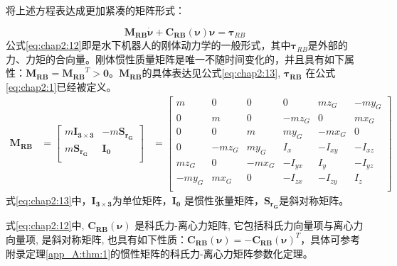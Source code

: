 将上述方程表达成更加紧凑的矩阵形式：

\begin{equation}
\label{eq:chap2:12}
\bm{M_{RB}} {\dot{\bm{\nu}}} + \bm{C_{RB}}(\bm{\nu}){\bm{\nu}} =  {\bm{\tau}_{RB}}
\end{equation}
公式\ref{eq:chap2:12}即是水下机器人的刚体动力学的一般形式，其中${\bm{\tau}_{RB}}$是外部的力、力矩的合向量。刚体惯性质量矩阵是唯一不随时间变化的，并且具有如下属性：$\bm{M_{RB}} = \bm{M_{RB}}^T > \bm{0}$。$\bm{M_{RB}}$的具体表达见公式\ref{eq:chap2:13}, $\bm{\tau_{RB}}$ 在公式\ref{eq:chap2:1}已经被定义。
\begin{equation}
\label{eq:chap2:13}
\begin{aligned}
\bm{M_{RB}} &= \begin{bmatrix}
               {m {\bm{I_{3 \times 3}} }} & {-m {\bm{S_{r_G}} } }   \\
                 m {\bm{S_{r_G}} }         &  \bm{I_0} \\
               \end{bmatrix}
            &= \begin{bmatrix}
                   m & 0       &  0    & 0        & m z_G   & -m y_G     \\
                   0 & m       &  0    & -m z_G   & 0       & m x_G      \\
                   0 & 0       &  m    &  m y_G   & -m x_G  & 0          \\
                   0 &  -m z_G & m y_G &  I_x     & -I_{xy} & -I_{xz}    \\
               m z_G &   0     & -m x_G& -I_{yx}  & I_y     & -I_{yz}    \\
              -m y_G &  m x_G  &  0    & -I_{zx}  & -I_{zy} & I_z        \\
               \end{bmatrix}
\end{aligned}
\end{equation}
式\ref{eq:chap2:13}中，${\bm{I_{3 \times 3}}}$为单位矩阵，$\bm{I_0}$ 是惯性张量矩阵，$\bm{S_{r_G}}$是斜对称矩阵。

式\ref{eq:chap2:12}中, ${\bm{C_{RB}}(\bm{\nu})}$ 是科氏力-离心力矩阵,  它包括科氏力向量项与离心力向量项, 是斜对称矩阵, 也具有如下性质：${\bm{C_{RB}}(\bm{\nu})}= - {\bm{C_{RB}}(\bm{\nu})}^T$，具体可参考附录定理\ref{app_A:thm:1}的惯性矩阵的科氏力-离心力矩阵参数化定理。

